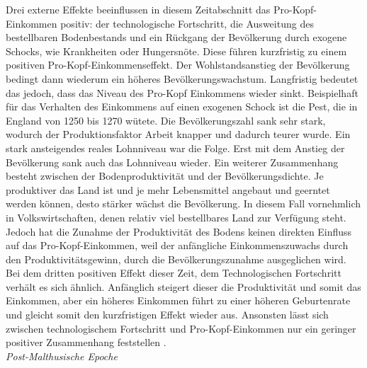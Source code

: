 Drei externe Effekte beeinflussen in diesem Zeitabschnitt das Pro-Kopf-Einkommen positiv: der technologische Fortschritt, die Ausweitung des bestellbaren Bodenbestands und ein R{\"u}ckgang der Bev{\"o}lkerung durch exogene Schocks, wie Krankheiten oder Hungersn{\"o}te. Diese f{\"u}hren kurzfristig zu einem positiven Pro-Kopf-Einkommenseffekt. Der Wohlstandsanstieg der Bev{\"o}lkerung bedingt dann wiederum ein h{\"o}heres Bev{\"o}lkerungswachstum. Langfristig bedeutet das jedoch, dass das Niveau des Pro-Kopf Einkommens wieder sinkt. Beispielhaft f{\"u}r das Verhalten des Einkommens auf einen exogenen Schock ist die Pest, die in England von 1250 bis 1270 w{\"u}tete. Die Bev{\"o}lkerungszahl sank sehr stark, wodurch der Produktionsfaktor Arbeit knapper und dadurch teurer wurde. Ein stark ansteigendes reales Lohnniveau war die Folge. Erst mit dem Anstieg der Bev{\"o}lkerung sank auch das Lohnniveau wieder. \newline Ein weiterer Zusammenhang besteht zwischen der Bodenproduktivit{\"a}t und der Bev{\"o}lkerungsdichte. Je produktiver das Land ist und je mehr Lebensmittel angebaut und geerntet werden k{\"o}nnen, desto st{\"a}rker w{\"a}chst die Bev{\"o}lkerung. In diesem Fall vornehmlich in Volkswirtschaften, denen relativ viel bestellbares Land zur Verf{\"u}gung steht. Jedoch hat die Zunahme der Produktivit{\"a}t des Bodens keinen direkten Einfluss auf das Pro-Kopf-Einkommen, weil der anf{\"a}ngliche Einkommenszuwachs durch den Produktivit{\"a}tsgewinn, durch die Bev{\"o}lkerungszunahme ausgeglichen wird. \newline Bei dem dritten positiven Effekt dieser Zeit, dem Technologischen Fortschritt verh{\"a}lt es sich {\"a}hnlich. Anf{\"a}nglich steigert dieser die Produktivit{\"a}t und somit das Einkommen, aber ein h{\"o}heres Einkommen f{\"u}hrt zu einer h{\"o}heren Geburtenrate und gleicht somit den kurzfristigen Effekt wieder aus. Ansonsten lässt sich zwischen technologischem Fortschritt und Pro-Kopf-Einkommen nur ein geringer positiver Zusammenhang feststellen \citep{Galor.2014}.\\


\textit{Post-Malthusische Epoche}\newline


